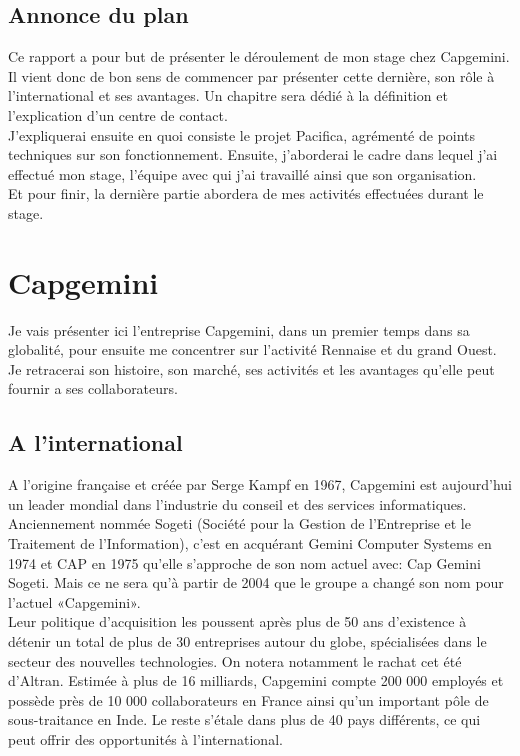 \documentclass{rapport}
\begin{document}
\subsection*{Annonce du plan}

Ce rapport a pour but de présenter le déroulement de mon stage chez Capgemini. Il vient donc de bon sens de commencer par présenter cette dernière, son rôle à l'international et ses avantages.
Un chapitre sera dédié à la définition et l'explication d'un centre de contact.\\
J'expliquerai ensuite en quoi consiste le projet Pacifica, agrémenté de points techniques sur son fonctionnement.
Ensuite, j'aborderai le cadre dans lequel j'ai effectué mon stage, l'équipe avec qui j'ai travaillé ainsi que son organisation.\\
Et pour finir, la dernière partie abordera de mes activités effectuées durant le stage.

\newpage

\section{Capgemini}

Je vais présenter ici l'entreprise Capgemini, dans un premier temps dans sa globalité, pour ensuite me concentrer sur l’activité Rennaise et du grand Ouest. Je retracerai son histoire, son marché, ses activités et les avantages qu'elle peut fournir a ses collaborateurs.

\subsection{A l'international}

A l'origine française et créée par Serge Kampf en 1967, Capgemini est aujourd'hui un leader mondial dans l'industrie du conseil et des services informatiques. Anciennement nommée Sogeti (Société pour la Gestion de l'Entreprise et le Traitement de l'Information), c'est en acquérant Gemini Computer Systems en 1974 et CAP en 1975 qu'elle s'approche de son nom actuel avec: Cap Gemini Sogeti. Mais ce ne sera qu'à partir de 2004 que le groupe a changé son nom pour l'actuel «Capgemini».\\

Leur politique d'acquisition les poussent après plus de 50 ans d'existence à détenir un total de plus de 30 entreprises autour du globe, spécialisées dans le secteur des nouvelles technologies. On notera notamment le rachat cet été d'Altran.
Estimée à plus de 16 milliards, Capgemini compte 200 000 employés et possède près de 10 000 collaborateurs en France ainsi qu'un important pôle de sous-traitance en Inde. Le reste s’étale dans plus de 40 pays différents, ce qui peut offrir des opportunités à l'international.
\end{document}
